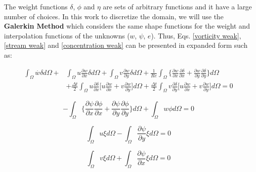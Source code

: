 The weight functions $\delta$, $\phi$ and $\eta$ 
are sets of arbitrary functions and it have a large number of choices. 
In this work to discretize the domain, we will use the 
\textbf{Galerkin Method} which considers the same shape functions 
for the weight and interpolation functions of the unknowns 
($w$, $\psi$, $e$). 
Thus, Eqs. \ref{vorticity weak}, \ref{stream weak} and
 \ref{concentration weak} 
can be presented in expanded form such as:

\begin{equation} 
\begin{aligned}
   \int_{\Omega} \overset{.}{w} \delta d\Omega 
 + & \int_{\Omega} u \frac{\partial w}{\partial x} \delta d\Omega 
 + \int_{\Omega} v \frac{\partial w}{\partial y} \delta d\Omega 
 + \frac{1}{\textit{Re}} \int_{\Omega} \Bigg\{ \frac{\partial w}{\partial x} \frac{\partial \delta}{\partial x} 
 + \frac{\partial w}{\partial y} \frac{\partial \delta}{\partial y} \Bigg\} d\Omega 
 \\[5pt]
 & + \frac{\Delta t}{2} \int_{\Omega} u \frac{\partial \delta}{\partial x}
 \Bigg[
   u \frac{\partial w}{\partial x}
 + v \frac{\partial w}{\partial y}
 \Bigg] d\Omega
 + \frac{\Delta t}{2} \int_{\Omega} v \frac{\partial \delta}{\partial y}
 \Bigg[
   u \frac{\partial w}{\partial x}
 + v \frac{\partial w}{\partial y}
 \Bigg] d\Omega
 = 0
\end{aligned}
\end{equation}

\begin{equation}
 - \int_{\Omega} \Bigg\{ \frac{\partial \psi}{\partial x} \frac{\partial \phi}{\partial x} 
 + \frac{\partial \psi}{\partial y} \frac{\partial \phi}{\partial y} \Bigg\} d\Omega
 + \int_{\Omega} w \phi d\Omega = 0
\end{equation}

\begin{equation}
   \int_{\Omega} u \xi d\Omega
 - \int_{\Omega} \frac{\partial \psi}{\partial y} \xi d\Omega = 0
\end{equation}

\begin{equation}
   \int_{\Omega} v \xi d\Omega
 + \int_{\Omega} \frac{\partial \psi}{\partial x} \xi d\Omega = 0
\end{equation}

